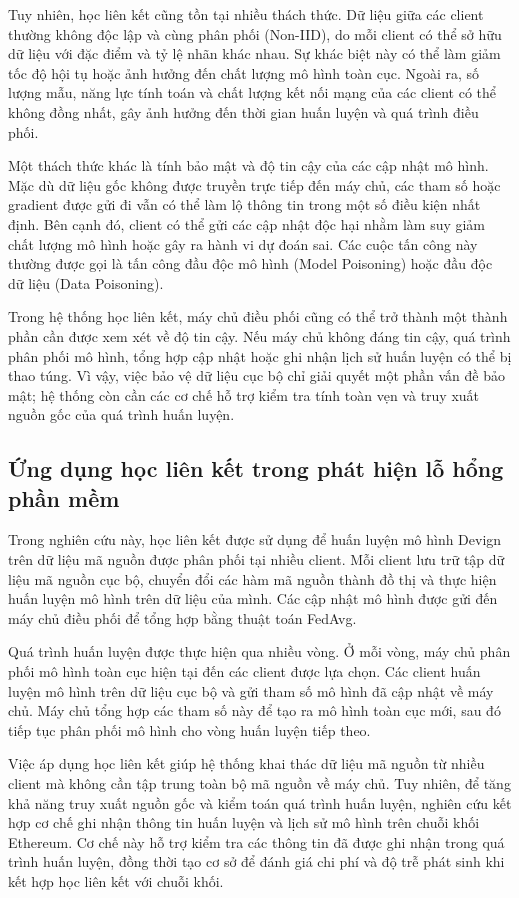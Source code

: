 Tuy nhiên, học liên kết cũng tồn tại nhiều thách thức. Dữ liệu giữa các client thường không độc lập
và cùng phân phối (Non-IID), do mỗi client có thể sở hữu dữ liệu với đặc điểm và tỷ lệ nhãn khác
nhau. Sự khác biệt này có thể làm giảm tốc độ hội tụ hoặc ảnh hưởng đến chất lượng mô hình toàn
cục. Ngoài ra, số lượng mẫu, năng lực tính toán và chất lượng kết nối mạng của các client có thể
không đồng nhất, gây ảnh hưởng đến thời gian huấn luyện và quá trình điều phối.

Một thách thức khác là tính bảo mật và độ tin cậy của các cập nhật mô hình. Mặc dù dữ liệu gốc
không được truyền trực tiếp đến máy chủ, các tham số hoặc gradient được gửi đi vẫn có thể làm lộ
thông tin trong một số điều kiện nhất định. Bên cạnh đó, client có thể gửi các cập nhật độc hại
nhằm làm suy giảm chất lượng mô hình hoặc gây ra hành vi dự đoán sai. Các cuộc tấn công này thường
được gọi là tấn công đầu độc mô hình (Model Poisoning) hoặc đầu độc dữ liệu (Data Poisoning).

Trong hệ thống học liên kết, máy chủ điều phối cũng có thể trở thành một thành phần cần được xem
xét về độ tin cậy. Nếu máy chủ không đáng tin cậy, quá trình phân phối mô hình, tổng hợp cập nhật
hoặc ghi nhận lịch sử huấn luyện có thể bị thao túng. Vì vậy, việc bảo vệ dữ liệu cục bộ chỉ giải
quyết một phần vấn đề bảo mật; hệ thống còn cần các cơ chế hỗ trợ kiểm tra tính toàn vẹn và truy
xuất nguồn gốc của quá trình huấn luyện.

\subsection{Ứng dụng học liên kết trong phát hiện lỗ hổng phần mềm}

Trong nghiên cứu này, học liên kết được sử dụng để huấn luyện mô hình Devign trên dữ liệu mã nguồn
được phân phối tại nhiều client. Mỗi client lưu trữ tập dữ liệu mã nguồn cục bộ, chuyển đổi các hàm
mã nguồn thành đồ thị và thực hiện huấn luyện mô hình trên dữ liệu của mình. Các cập nhật mô hình
được gửi đến máy chủ điều phối để tổng hợp bằng thuật toán FedAvg.

Quá trình huấn luyện được thực hiện qua nhiều vòng. Ở mỗi vòng, máy chủ phân phối mô hình toàn cục
hiện tại đến các client được lựa chọn. Các client huấn luyện mô hình trên dữ liệu cục bộ và gửi
tham số mô hình đã cập nhật về máy chủ. Máy chủ tổng hợp các tham số này để tạo ra mô hình toàn cục
mới, sau đó tiếp tục phân phối mô hình cho vòng huấn luyện tiếp theo.

Việc áp dụng học liên kết giúp hệ thống khai thác dữ liệu mã nguồn từ nhiều client mà không cần tập
trung toàn bộ mã nguồn về máy chủ. Tuy nhiên, để tăng khả năng truy xuất nguồn gốc và kiểm toán quá
trình huấn luyện, nghiên cứu kết hợp cơ chế ghi nhận thông tin huấn luyện và lịch sử mô hình trên
chuỗi khối Ethereum. Cơ chế này hỗ trợ kiểm tra các thông tin đã được ghi nhận trong quá trình huấn
luyện, đồng thời tạo cơ sở để đánh giá chi phí và độ trễ phát sinh khi kết hợp học liên kết với
chuỗi khối.


